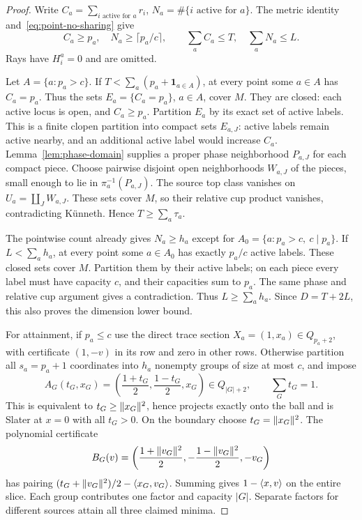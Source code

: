 \begin{proof}
Write
$C_a=\sum_{i\text{ active for }a}r_i$, $N_a=\#\{i\text{ active for }a\}$.
The metric identity and~\eqref{eq:point-no-sharing} give
\[
 C_a\geq p_a,\quad N_a\geq\lceil p_a/c\rceil,
 \qquad\sum_aC_a\leq T,\quad\sum_aN_a\leq L.
\]
Rays have $H_i^a=0$ and are omitted.

Let $A=\{a:p_a>c\}$. If $T<\sum_a(p_a+\mathbf1_{a\in A})$, at every
point some $a\in A$ has $C_a=p_a$. Thus the sets
$E_a=\{C_a=p_a\}$, $a\in A$, cover $M$. They are closed: each active
locus is open, and $C_a\geq p_a$. Partition $E_a$ by its exact set of
active labels. This is a finite clopen partition into compact sets
$E_{a,J}$: active labels remain active nearby, and an additional active
label would increase $C_a$. Lemma~\ref{lem:phase-domain} supplies a
proper phase neighborhood $P_{a,J}$ for each compact piece. Choose
pairwise disjoint open neighborhoods $W_{a,J}$ of the pieces, small
enough to lie in $\pi_a^{-1}(P_{a,J})$. The source top class vanishes
on $U_a=\coprod_JW_{a,J}$. These sets cover $M$, so their relative cup
product vanishes, contradicting K\"unneth. Hence $T\geq\sum_a\tau_a$.

The pointwise count already gives $N_a\geq h_a$ except for
$A_0=\{a:p_a>c,\ c\mid p_a\}$. If $L<\sum_ah_a$, at every point
some $a\in A_0$ has exactly $p_a/c$ active labels. These closed sets
cover $M$. Partition them by their active labels; on each piece every
label must
have capacity $c$, and their capacities sum to $p_a$. The same phase
and relative cup argument gives a contradiction. Thus $L\geq\sum_ah_a$.
Since $D=T+2L$, this also proves the dimension lower bound.

For attainment, if $p_a\leq c$ use the direct trace section
$X_a=(1,x_a)\in Q_{p_a+2}$, with certificate $(1,-v)$ in its row
and zero in other rows. Otherwise partition all $s_a=p_a+1$ coordinates
into $h_a$ nonempty groups of size at most $c$, and impose
\begin{equation}\label{eq:grouped-lorentz}
 A_G(t_G,x_G)=\left(\frac{1+t_G}{2},\frac{1-t_G}{2},x_G\right)
 \in Q_{|G|+2},\qquad\sum_Gt_G=1.
\end{equation}
This is equivalent to $t_G\geq\lVert x_G\rVert^2$, hence projects exactly
onto the ball and is Slater at $x=0$ with all $t_G>0$. On the boundary
choose $t_G=\lVert x_G\rVert^2$. The polynomial certificate
\[
 B_G(v)=\left(\frac{1+\lVert v_G\rVert^2}{2},
 -\frac{1-\lVert v_G\rVert^2}{2},-v_G\right)
\]
has pairing $(t_G+\lVert v_G\rVert^2)/2-\langle x_G,v_G\rangle$.
Summing gives $1-\langle x,v\rangle$ on the entire slice. Each group contributes
one factor and capacity $|G|$. Separate factors for different sources
attain all three claimed minima.
\end{proof}

